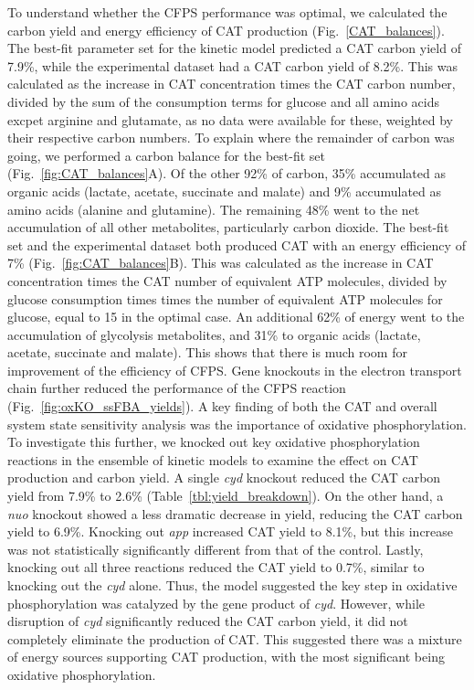 \documentclass[12pt]{article}
\begin{document}
To understand whether the CFPS performance was optimal, we calculated the carbon yield and energy efficiency of CAT production (Fig.~\ref{CAT_balances}).
The best-fit parameter set for the kinetic model predicted a CAT carbon yield of 7.9\%, while the experimental dataset had a CAT carbon yield of 8.2\%.
This was calculated as the increase in CAT concentration times the CAT carbon number, divided by the sum of the consumption terms for glucose and all amino acids excpet arginine and glutamate, as no data were available for these, weighted by their respective carbon numbers.
To explain where the remainder of carbon was going, we performed a carbon balance for the best-fit set (Fig.~\ref{fig:CAT_balances}A).
Of the other 92\% of carbon, 35\% accumulated as organic acids (lactate, acetate, succinate and malate) and 9\% accumulated as amino acids (alanine and glutamine).
The remaining 48\% went to the net accumulation of all other metabolites, particularly carbon dioxide.
The best-fit set and the experimental dataset both produced CAT with an energy efficiency of 7\% (Fig.~\ref{fig:CAT_balances}B).
This was calculated as the increase in CAT concentration times the CAT number of equivalent ATP molecules, divided by glucose consumption times times the number of equivalent ATP molecules for glucose, equal to 15 in the optimal case.
An additional 62\% of energy went to the accumulation of glycolysis metabolites, and 31\% to organic acids (lactate, acetate, succinate and malate).
This shows that there is much room for improvement of the efficiency of CFPS.
Gene knockouts in the electron transport chain further reduced the performance of the CFPS reaction (Fig.~\ref{fig:oxKO_ssFBA_yields}).
A key finding of both the CAT and overall system state sensitivity analysis was the importance of oxidative phosphorylation.
To investigate this further, we knocked out key oxidative phosphorylation reactions in the ensemble of kinetic models to examine the effect on CAT production and carbon yield.
A single \textit{cyd} knockout reduced the CAT carbon yield from 7.9\% to 2.6\% (Table~\ref{tbl:yield_breakdown}).
On the other hand, a \textit{nuo} knockout showed a less dramatic decrease in yield,
reducing the CAT carbon yield to 6.9\%.
Knocking out \textit{app} increased CAT yield to 8.1\%, but this increase was not statistically significantly different from that of the control.
Lastly, knocking out all three reactions reduced the CAT yield to 0.7\%, similar to knocking out the \textit{cyd} alone.
Thus, the model suggested the key step in oxidative phosphorylation was catalyzed by the gene product of \textit{cyd}.
However, while disruption of \textit{cyd} significantly reduced the CAT carbon yield, it did not completely eliminate the production of CAT.
This suggested there was a mixture of energy sources supporting CAT production, with the most significant being oxidative phosphorylation.
\end{document}
